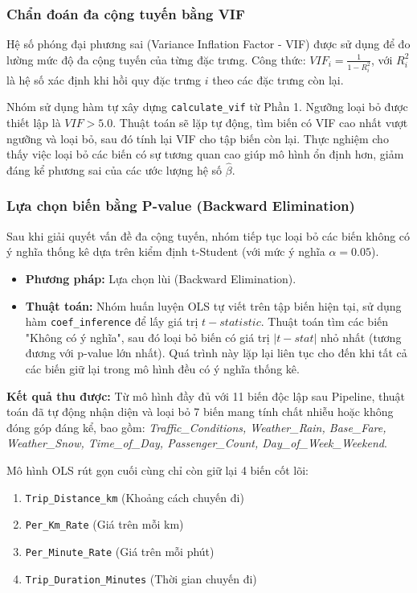 \subsubsection{Chẩn đoán đa cộng tuyến bằng VIF}
Hệ số phóng đại phương sai (Variance Inflation Factor - VIF) được sử dụng để đo lường mức độ đa cộng tuyến của từng đặc trưng. Công thức: $VIF_i = \frac{1}{1 - R_i^2}$, với $R_i^2$ là hệ số xác định khi hồi quy đặc trưng $i$ theo các đặc trưng còn lại. 

Nhóm sử dụng hàm tự xây dựng \texttt{calculate\_vif} từ Phần 1. Ngưỡng loại bỏ được thiết lập là $VIF > 5.0$. Thuật toán sẽ lặp tự động, tìm biến có VIF cao nhất vượt ngưỡng và loại bỏ, sau đó tính lại VIF cho tập biến còn lại. 
Thực nghiệm cho thấy việc loại bỏ các biến có sự tương quan cao giúp mô hình ổn định hơn, giảm đáng kể phương sai của các ước lượng hệ số $\hat{\beta}$.

\subsubsection{Lựa chọn biến bằng P-value (Backward Elimination)}
Sau khi giải quyết vấn đề đa cộng tuyến, nhóm tiếp tục loại bỏ các biến không có ý nghĩa thống kê dựa trên kiểm định t-Student (với mức ý nghĩa $\alpha = 0.05$).
\begin{itemize}
    \item \textbf{Phương pháp:} Lựa chọn lùi (Backward Elimination).
    \item \textbf{Thuật toán:} Nhóm huấn luyện OLS tự viết trên tập biến hiện tại, sử dụng hàm \texttt{coef\_inference} để lấy giá trị $t-statistic$. Thuật toán tìm các biến "Không có ý nghĩa", sau đó loại bỏ biến có giá trị $|t-stat|$ nhỏ nhất (tương đương với p-value lớn nhất). Quá trình này lặp lại liên tục cho đến khi tất cả các biến giữ lại trong mô hình đều có ý nghĩa thống kê.
\end{itemize}

\textbf{Kết quả thu được:}
Từ mô hình đầy đủ với 11 biến độc lập sau Pipeline, thuật toán đã tự động nhận diện và loại bỏ 7 biến mang tính chất nhiễu hoặc không đóng góp đáng kể, bao gồm: \textit{Traffic\_Conditions, Weather\_Rain, Base\_Fare, Weather\_Snow, Time\_of\_Day, Passenger\_Count, Day\_of\_Week\_Weekend}.

Mô hình OLS rút gọn cuối cùng chỉ còn giữ lại 4 biến cốt lõi: 
\begin{enumerate}
    \item \texttt{Trip\_Distance\_km} (Khoảng cách chuyến đi)
    \item \texttt{Per\_Km\_Rate} (Giá trên mỗi km)
    \item \texttt{Per\_Minute\_Rate} (Giá trên mỗi phút)
    \item \texttt{Trip\_Duration\_Minutes} (Thời gian chuyến đi)
\end{enumerate}

